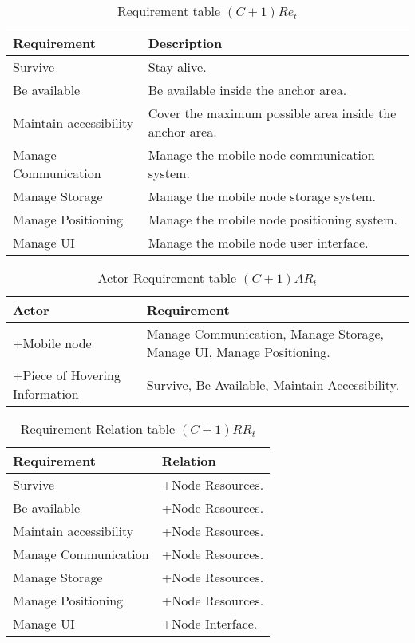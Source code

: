 \begin{table}[H]
	\centering
	\begin{tabular}{|p{4cm}|p{8cm}|}
			\hline
			\textbf{Requirement} & \textbf{Description} \\
			\hline
			Survive & Stay alive. \\
			\hline
			Be available & Be available inside the anchor area. \\
			\hline
			Maintain accessibility & Cover the maximum possible area inside the
			anchor area. \\
			\hline
			Manage Communication & Manage the mobile node communication system. \\
			\hline
			Manage Storage & Manage the mobile node storage system. \\
			\hline
			Manage Positioning & Manage the mobile node positioning system. \\
			\hline
			Manage UI & Manage the mobile node user interface. \\
			\hline
		\end{tabular}
	\caption{Requirement table $(C+1)Re_t$}
	\label{tab:cp1act}
\end{table}

\begin{table}[H]
	\centering
	\begin{tabular}{|p{4cm}|p{8cm}|}
			\hline
			\textbf{Actor} & \textbf{Requirement} \\
			\hline
			+Mobile node & Manage Communication, Manage Storage, Manage UI, Manage
			Positioning. \\
			\hline
			+Piece of Hovering Information & Survive, Be Available, Maintain
			Accessibility. \\
			\hline
		\end{tabular}
	\caption{Actor-Requirement table $(C+1)AR_t$}
	\label{tab:cp1art}
\end{table}

\begin{table}[H]
	\centering
	\begin{tabular}{|p{4cm}|p{8cm}|}
			\hline
			\textbf{Requirement} & \textbf{Relation} \\
			\hline
			Survive & +Node Resources. \\
			\hline
			Be available & +Node Resources. \\
			\hline
			Maintain accessibility & +Node Resources. \\
			\hline
			Manage Communication & +Node Resources. \\
			\hline
			Manage Storage & +Node Resources. \\
			\hline
			Manage Positioning & +Node Resources. \\
			\hline
			Manage UI &  +Node Interface.\\
			\hline
		\end{tabular}
	\caption{Requirement-Relation table $(C+1)RR_t$}
	\label{tab:cp1rrt}
\end{table}

